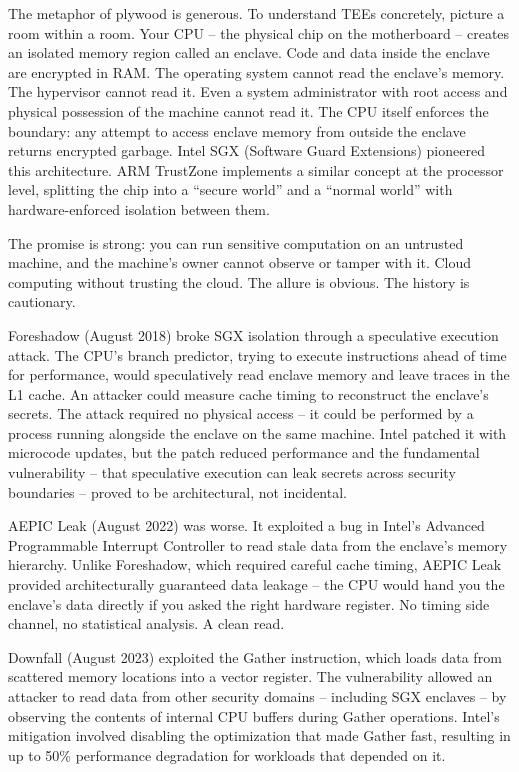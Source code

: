 \documentclass[
  11pt,
  openany]{report}
\begin{document}
The metaphor of plywood is generous. To understand TEEs concretely, picture a
room within a room. Your CPU -- the physical chip on the motherboard -- creates
an isolated memory region called an enclave. Code and data inside the enclave
are encrypted in RAM. The operating system cannot read the enclave's memory. The
hypervisor cannot read it. Even a system administrator with root access and
physical possession of the machine cannot read it. The CPU itself enforces the
boundary: any attempt to access enclave memory from outside the enclave returns
encrypted garbage. Intel SGX (Software Guard Extensions) pioneered this
architecture. ARM TrustZone implements a similar concept at the processor level,
splitting the chip into a ``secure world'' and a ``normal world'' with
hardware-enforced isolation between them.

The promise is strong: you can run sensitive computation on an untrusted
machine, and the machine's owner cannot observe or tamper with it. Cloud
computing without trusting the cloud. The allure is obvious. The history is
cautionary.

Foreshadow (August 2018) broke SGX isolation through a speculative execution
attack. The CPU's branch predictor, trying to execute instructions ahead of time
for performance, would speculatively read enclave memory and leave traces in the
L1 cache. An attacker could measure cache timing to reconstruct the enclave's
secrets. The attack required no physical access -- it could be performed by a
process running alongside the enclave on the same machine. Intel patched it with
microcode updates, but the patch reduced performance and the fundamental
vulnerability -- that speculative execution can leak secrets across security
boundaries -- proved to be architectural, not incidental.

AEPIC Leak (August 2022) was worse. It exploited a bug in Intel's Advanced
Programmable Interrupt Controller to read stale data from the enclave's memory
hierarchy. Unlike Foreshadow, which required careful cache timing, AEPIC Leak
provided architecturally guaranteed data leakage -- the CPU would hand you the
enclave's data directly if you asked the right hardware register. No timing side
channel, no statistical analysis. A clean read.

Downfall (August 2023) exploited the Gather instruction, which loads data from
scattered memory locations into a vector register. The vulnerability allowed an
attacker to read data from other security domains -- including SGX enclaves --
by observing the contents of internal CPU buffers during Gather operations.
Intel's mitigation involved disabling the optimization that made Gather fast,
resulting in up to 50\% performance degradation for workloads that depended on
it.
\end{document}
